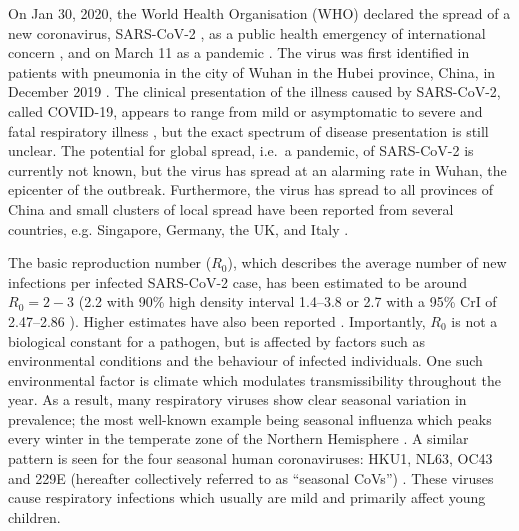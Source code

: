 \documentclass[rmp, reprint, superscriptaddress, floatfix,amsmath]{revtex4-1}
\begin{document}
On Jan 30, 2020, the World Health Organisation (WHO) declared the spread of a new coronavirus, SARS-CoV-2 \citep{ICTV_SARS-CoV-2}, as a public health emergency of international concern \citep{WHO_statement}, and on March 11 as a pandemic \citep{WHOpandemic}.
The virus was first identified in patients with pneumonia in the city of Wuhan in the Hubei province, China, in December 2019 \citep{Liangjun2020rna}.
The clinical presentation of the illness caused by SARS-CoV-2, called COVID-19, appears to range from mild or asymptomatic to severe and fatal respiratory illness \citep{WHO_China2020joint}, but the exact spectrum of disease presentation is still unclear. 
The potential for global spread, i.e.~a pandemic, of SARS-CoV-2 is currently not known, but the virus has spread at an alarming rate in Wuhan, the epicenter of the outbreak. Furthermore, the virus has spread to all provinces of China and small clusters of local spread have been reported from several countries, e.g. Singapore, Germany, the UK, and Italy \citep{WHO_situation_report23, rothe2020transmission, MOH_Singapore, ECDC_report9March}. 

The basic reproduction number ($R_0$), which describes the average number of new infections per infected SARS-CoV-2 case, has been estimated to be around $R_0 = 2 - 3$ (2.2  with 90\% high density interval 1.4–3.8 \citep{Riou2020pattern} or 2.7 with a 95\% CrI of 2.47–2.86 \citep{wu_nowcasting_2020}).
Higher estimates have also been reported \citep{yang_epidemiological_2020,sanche_novel_2020}. Importantly, $R_0$ is not a biological constant for a pathogen, but is affected by factors such as environmental conditions and the behaviour of infected individuals. One such environmental factor is climate which modulates transmissibility throughout the year. 
As a result, many respiratory viruses show clear seasonal variation in prevalence; the most well-known example being seasonal influenza which peaks every winter in the temperate zone of the Northern Hemisphere \citep{petrova_evolution_2018}. 
A similar pattern is seen for the four seasonal human coronaviruses: HKU1, NL63, OC43 and 229E (hereafter collectively referred to as ``seasonal CoVs'') \citep{killerby2018human,goes2019typical,galanti2019longitudinal,friedman2018human,al2016diversity,huang2017epidemiology}. 
These viruses cause respiratory infections which usually are mild and primarily affect young children. 
         
\end{document}
